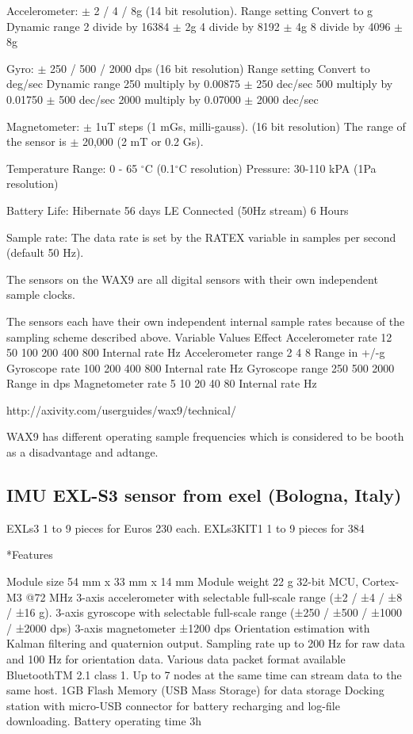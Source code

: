  Accelerometer:	$\pm$ 2 / 4 / 8g (14 bit resolution).
 Range setting 	Convert to g 	Dynamic range
 2 	divide by 16384 $\pm$ 2g
 4 	divide by 8192 	$\pm$ 4g
 8 	divide by 4096 	$\pm$ 8g


Gyro: 	$\pm$ 250 / 500 / 2000 dps (16 bit resolution)
Range setting 	Convert to deg/sec 	Dynamic range
250 	multiply by 0.00875 	$\pm$ 250 dec/sec
500 	multiply by 0.01750 	$\pm$ 500 dec/sec
2000 	multiply by 0.07000 	$\pm$ 2000 dec/sec

 Magnetometer: 	$\pm$ 1uT steps (1 mGs, milli-gauss). (16 bit resolution)
 The range of the sensor is $\pm$ 20,000 (2 mT or 0.2 Gs).

Temperature Range: 	0 - 65 $^{\circ}$C (0.1$^{\circ}$C resolution)
Pressure: 	30-110 kPA (1Pa resolution)


 Battery Life:
 Hibernate 	56 days
 LE Connected (50Hz stream) 	6 Hours

 Sample rate:
 The data rate is set by the RATEX variable in samples per second (default 50 Hz).

 The sensors on the WAX9 are all digital sensors with their own independent sample clocks.

 The sensors each have their own independent internal sample rates because of the
 sampling scheme described above.
 Variable 	Values 	Effect
 Accelerometer rate 	12 50 100 200 400 800 	Internal rate Hz
 Accelerometer range 	2 4 8 	Range in +/-g
 Gyroscope rate 	100 200 400 800 	Internal rate Hz
 Gyroscope range 	250 500 2000 	Range in dps
 Magnetometer rate 	5 10 20 40 80 	Internal rate Hz

 http://axivity.com/userguides/wax9/technical/

 WAX9 has different operating sample frequencies which is considered
 to be booth as a disadvantage and adtange.




 \subsection*{IMU EXL-S3 sensor from exel (Bologna, Italy)}

 EXLs3 1 to 9 pieces for Euros 230 each.
 EXLs3KIT1 1 to 9 pieces for 384

 *Features

 Module size 54 mm x 33 mm x 14 mm
 Module weight 22 g
 32-bit MCU, Cortex-M3 @72 MHz
 3-axis accelerometer with selectable full-scale range (±2 / ±4 / ±8 / ±16 g).
 3-axis gyroscope with selectable full-scale range (±250 / ±500 / ±1000 / ±2000 dps)
 3-axis magnetometer ±1200 dps
 Orientation estimation with Kalman filtering and quaternion output.
 Sampling rate up to 200 Hz for raw data and 100 Hz for orientation data.
 Various data packet format available
 BluetoothTM 2.1 class 1.
 Up to 7 nodes at the same time can stream data to the same host.
 1GB Flash Memory (USB Mass Storage) for data storage
 Docking station with micro-USB connector for battery recharging and log-file downloading.
 Battery operating time 3h

